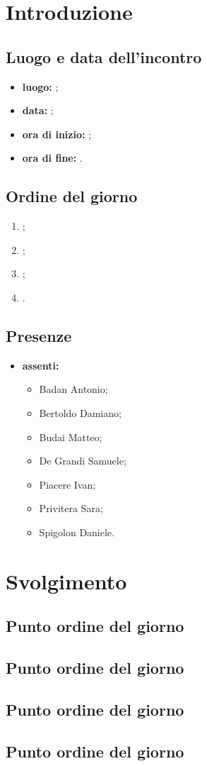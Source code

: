 \section*{Introduzione}
\subsection*{Luogo e data dell'incontro}
\begin{itemize}
	\item \textbf{luogo:} ;
	\item \textbf{data:} ;
	\item \textbf{ora di inizio:} ;
	\item \textbf{ora di fine:} .
\end{itemize}

\subsection*{Ordine del giorno}
\begin{enumerate}
	\item ;
	\item ;
	\item ;
	\item .
\end{enumerate}

\subsection*{Presenze}
\begin{itemize}
	\item \textbf{assenti:}
	\begin{itemize}
		\item Badan Antonio;
		\item Bertoldo Damiano;
		\item Budai Matteo;
		\item De Grandi Samuele;
		\item Piacere Ivan;
		\item Privitera Sara;
		\item Spigolon Daniele.
	\end{itemize}
\end{itemize}

\section*{Svolgimento}
\subsection*{Punto ordine del giorno}
\subsection*{Punto ordine del giorno}
\subsection*{Punto ordine del giorno}
\subsection*{Punto ordine del giorno}
